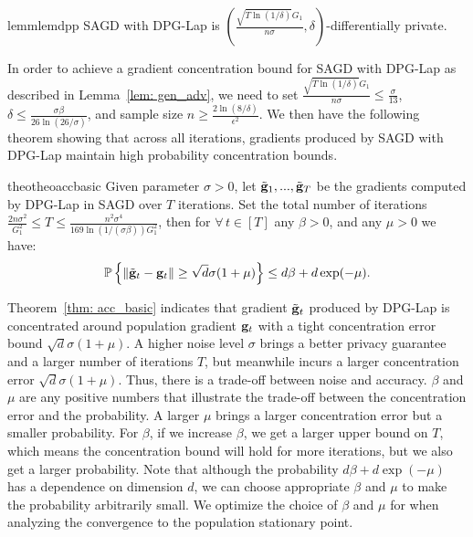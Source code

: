 \documentclass[11pt]{article}
\begin{document}
\begin{restatable}{lemm}{lemdpp}
\label{lemma dpp}
	SAGD with DPG-Lap is 
	$(\frac{\sqrt{T \ln(1/\delta)} G_1}{n\sigma}, \delta)$-differentially private. 
\end{restatable} 


In order to achieve a gradient concentration bound for SAGD with DPG-Lap as described in Lemma~\ref{lem: gen_adv}, we need to set $\frac{\sqrt{T \ln(1/\delta)} G_1}{n\sigma} \leq \frac{\sigma}{13}$, $\delta \leq \frac{\sigma \beta}{26 \ln(26/\sigma)}$, and  sample size $n \geq \frac{2\ln(8/\delta)}{\epsilon^2}$. We then have the following theorem showing that across all iterations, gradients produced by SAGD with DPG-Lap maintain high probability concentration bounds.

\begin{restatable}{theo}{theoaccbasic}
\label{thm: acc_basic}
Given parameter $\sigma > 0$, let $\tilde {\mathbf{g}}_1,...,  \tilde {\mathbf{g}}_T$ be the gradients computed by DPG-Lap in SAGD over $T$ iterations. Set the total number of iterations $ \frac{2n\sigma^2}{G_1^2}\leq T \leq \frac{n^2 \sigma^4}{169 \ln(1/(\sigma \beta))G_1^2}$, then for $\forall\, t \in [T]$ any $\beta >0$, and any $\mu > 0$ we have:
    \begin{equation*}
    \mathbb{P}\left\{\|\tilde {\mathbf{g}}_t - \mathbf{g}_t\| \geq \sqrt{d}\sigma(1+\mu)\right\} \leq d\beta + d\exp(-\mu).
    \end{equation*}
\end{restatable}


Theorem~\ref{thm: acc_basic} indicates that gradient $\tilde {\mathbf{g}}_t$
produced by DPG-Lap is concentrated around population gradient $\mathbf{g}_t$ with a tight concentration error bound $\sqrt{d}\sigma(1+\mu)$. A higher noise level $\sigma$ brings a better privacy 
guarantee  and a larger number of iterations $T$, but meanwhile incurs a 
larger concentration error $\sqrt{d}\sigma(1+\mu)$. Thus, there is a trade-off between noise and accuracy. $\beta$ and $\mu$ are any positive numbers that illustrate the trade-off between the concentration error and the probability. A larger $\mu$ brings a larger concentration error but a smaller probability. For $\beta$, if we increase $\beta$, we get a larger upper bound on $T$, which means the concentration bound will hold for more iterations, but we also get a larger probability. Note that although the probability $d\beta + d\exp(-\mu)$ has a dependence on dimension $d$, we can choose appropriate $\beta$ and $\mu$ to make the probability arbitrarily small.  We optimize the choice of $\beta$ and $\mu$ for when analyzing the convergence to the population stationary point.
\end{document}
